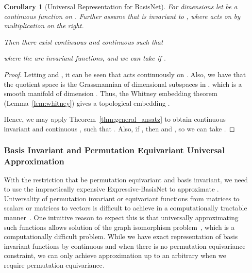 \documentclass{article} \usepackage{iclr2023_conference,times}
\newtheorem{corollary}{Corollary}
\begin{document}
\begin{corollary}[Universal Representation for BasisNet]\label{cor:universal_basisnet}
    For dimensions  let  be a continuous function on . Further assume that  is invariant to , where  acts on  by multiplication on the right. 

    Then there exist continuous  and continuous  such that
    
    where the  are  invariant functions, and we can take  if .
\end{corollary}
\begin{proof}
    Letting  and , it can be seen that  acts continuously on . Also, we have that the quotient space  is the Grassmannian of  dimensional subspaces in , which is a smooth manifold of dimension . Thus, the Whitney embedding theorem (Lemma~\ref{lem:whitney}) gives a topological embedding .

    Hence, we may apply Theorem~\ref{thm:general_ansatz} to obtain continuous  invariant  and continuous , such that . Also, if , then  and , so we can take .

\end{proof}

\subsubsection{Basis Invariant and Permutation Equivariant Universal Approximation}

With the restriction that  be permutation equivariant and basis invariant, we need to use the impractically expensive Expressive-BasisNet to approximate . Universality of permutation invariant or equivariant functions from matrices to scalars or matrices to vectors is difficult to achieve in a computationally tractable manner~\citep{maron2019universality,keriven2019universal, maehara2019simple}. One intuitive reason to expect this is that universally approximating such functions allows solution of the graph isomorphism problem~\citep{chen2019equivalence}, which is a computationally difficult problem. While we have exact representation of basis invariant functions by continuous  and  when there is no permutation equivariance constraint, we can only achieve approximation up to an arbitrary  when we require permutation equivariance.
\end{document}
